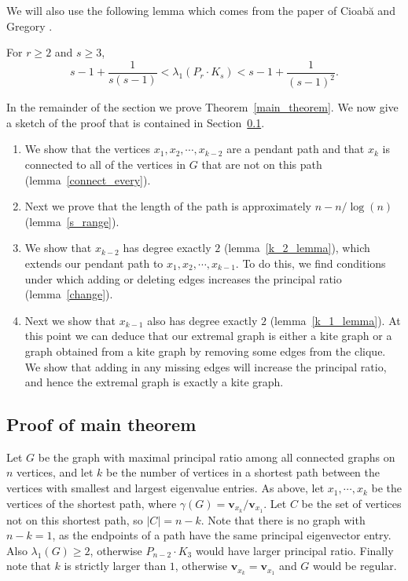 We will also use the following lemma which comes from the
paper of Cioab\u{a} and Gregory \cite{CioabaGregory2007}.

\begin{lemma}\label{kite_lambda}
  For $r \geq 2$ and $s \geq 3$,
   \[ s - 1 + \frac{1}{s(s-1)} < \lambda_1(P_r \cdot K_s) < s - 1 + \frac{1}{(s-1)^2} . \]
\end{lemma}

In the remainder of the section  we prove Theorem~\ref{main_theorem}.
We now give a sketch of the proof that is contained in Section~\ref{sec_proof}.

\begin{enumerate}
 \item We show that the vertices $x_1, x_2, \cdots, x_{k-2}$ are
   a pendant path and that $x_k$ is connected to all of the vertices
   in $G$ that are not on this path (lemma~\ref{connect_every}).
 \item Next we prove that the length of the path is approximately
   $n - n/\log(n)$ (lemma~\ref{s_range}).
 \item We show that $x_{k-2}$ has degree exactly $2$ (lemma~\ref{k_2_lemma}), which
   extends our pendant path to $x_1, x_2, \cdots, x_{k-1}$.
   To do this, we find conditions under which adding or deleting
   edges increases the principal ratio (lemma~\ref{change}).
 \item Next we show that $x_{k-1}$ also has degree exactly $2$ (lemma~\ref{k_1_lemma}).
   At this point we can deduce that our extremal graph is either
   a kite graph or a graph obtained from a kite graph
   by removing some edges from the clique.  We show that
   adding in any missing edges will increase the principal ratio,
   and hence the extremal graph is exactly a kite graph.
   
\end{enumerate}

\subsection{Proof of main theorem}\label{sec_proof}



Let $G$ be the graph with maximal principal ratio among all connected
graphs on $n$ vertices, and let $k$ be the number of vertices in a
shortest path between the vertices with smallest and largest eigenvalue
entries. As above, let $x_1,\cdots, x_k$ be the vertices of the shortest path, where
$\gamma(G) = \mathbf{v}_{x_k} / \mathbf{v}_{x_1}$.  Let $C$ be the set of vertices not on this shortest
path, so $|C| = n-k$.  Note that there is no graph with $n-k=1$, as the endpoints of a path have the same principal eigenvector entry.  Also
$\lambda_1(G) \geq 2$, otherwise $P_{n-2} \cdot K_3$ would have larger
principal ratio.  Finally note that $k$ is strictly larger than $1$,
otherwise $\mathbf{v}_{x_k} = \mathbf{v}_{x_1}$ and $G$ would be regular.


